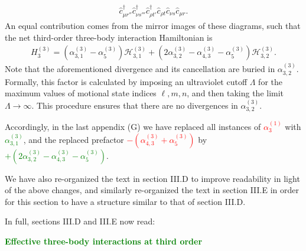\documentclass[preprint,showkeys,nofootinbib]{revtex4-1}
\newcommand{\p}[1]{\left(#1\right)} %
\renewcommand{\c}{\hat{c}}
\renewcommand{\H}{\mathcal{H}}
\newcommand{\1}{\mathds{1}}
\newcommand{\red}[1]{\textcolor{red}{#1}}
\newcommand{\green}[1]{\textcolor{green}{#1}}
\begin{document}
\begin{enumerate}
{\begin{align}
      \c_{\mu r''}^\dag \c_{\nu s'''}^\dag \c_{\rho t'}^\dag
      \c_{\rho t} \c_{\nu s} \c_{\mu r}.
      \tag{35}
    \end{align}
    An equal contribution comes from the mirror images of these
    diagrams, such that the net third-order three-body interaction
    Hamiltonian is
    \begin{align}
      H_3^{(3)} = \p{\alpha_{3,1}^{(3)} - \alpha_5^{(3)}} \H_{3,1}^{(3)}
      + \p{2\alpha_{3,2}^{(3)} - \alpha_{4,3}^{(3)} - \alpha_5^{(3)}}
      \H_{3,2}^{(3)}.
      \tag{36}
    \end{align}
    Note that the aforementioned divergence and its cancellation are
    buried in $\alpha_{3,2}^{(3)}$.  Formally, this factor is
    calculated by imposing an ultraviolet cutoff $\Lambda$ for the
    maximum values of motional state indices $\ell,m,n$, and then
    taking the limit $\Lambda\to\infty$.  This procedure ensures that
    there are no divergences in $\alpha_{3,2}^{(3)}$.}

  Accordingly, in the last appendix (G) we have replaced all instances
  of \red{$\alpha_3^{(1)}$} with \green{$\alpha_{3,1}^{(3)}$}, and the
  replaced prefactor \red{$-\p{\alpha_{4,3}^{(3)}+\alpha_5^{(3)}}$} by
  \green{$+ \p{2\alpha_{3,2}^{(3)} - \alpha_{4,3}^{(3)} -
      \alpha_5^{(3)}}$}.

  We have also re-organized the text in section III.D to improve
  readability in light of the above changes, and similarly
  re-organized the text in section III.E in order for this section to
  have a structure similar to that of section III.D.

  In full, sections III.D and III.E now read:

  \green{{\bf Effective three-body interactions at third order}}


\end{enumerate}
\end{document}
